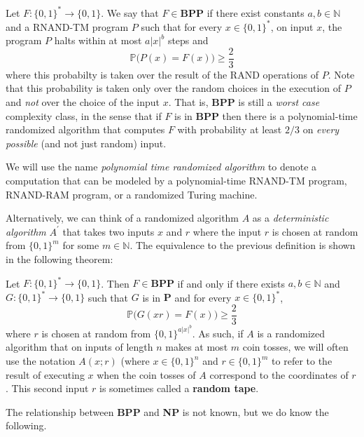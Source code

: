 \documentclass{article}
\begin{document}
  \begin{definition}
  Let $F: \{0, 1\}^* \longrightarrow \{0,1\}$. We say that $F \in \mathbf{BPP}$ if there exist constants $a, b \in \mathbb{N}$ and a RNAND-TM program $P$ such that for every $x \in \{0,1\}^*$, on input $x$, the program $P$ halts within at most $a |x|^b$ steps and 
  \[\mathbb{P} \big(P(x) = F(x)\big) \geq \frac{2}{3}\]
  where this probabilty is taken over the result of the RAND operations of $P$. Note that this probability is taken only over the random choices in the execution of $P$ and \textit{not} over the choice of the input $x$. That is, \textbf{BPP} is still a \textit{worst case} complexity class, in the sense that if $F$ is in \textbf{BPP} then there is a polynomial-time randomized algorithm that computes $F$ with probability at least $2/3$ on \textit{every possible} (and not just random) input. 
  \end{definition}

  We will use the name \textit{polynomial time randomized algorithm} to denote a computation that can be modeled by a polynomial-time RNAND-TM program, RNAND-RAM program, or a randomized Turing machine. 

  Alternatively, we can think of a randomized algorithm $A$ as a \textit{deterministic algorithm} $A^\prime$ that takes two inputs $x$ and $r$ where the input $r$ is chosen at random from $\{0, 1\}^m$ for some $m \in \mathbb{N}$. The equivalence to the previous definition is shown in the following theorem: 

  \begin{definition}
  Let $F: \{0, 1\}^* \longrightarrow \{0, 1\}$. Then $F \in \mathbf{BPP}$ if and only if there exists $a, b \in \mathbb{N}$ and $G: \{0, 1\}^* \longrightarrow \{0, 1\}$ such that $G$ is in $\mathbf{P}$ and for every $x \in \{0, 1\}^*$, 
  \[\mathbb{P}\big( G(xr) = F(x)\big) \geq \frac{2}{3}\]
  where $r$ is chosen at random from $\{0, 1\}^{a|x|^b}$. As such, if $A$ is a randomized algorithm that on inputs of length $n$ makes at most $m$ coin tosses, we will often use the notation $A(x; r)$ (where $x \in \{0, 1\}^n$ and $r \in \{0, 1\}^m$ to refer to the result of executing $x$ when the coin tosses of $A$ correspond to the coordinates of $r$. This second input $r$ is sometimes called a \textbf{random tape}.
  \end{definition}

  The relationship between \textbf{BPP} and \textbf{NP} is not known, but we do know the following. 
\end{document}
